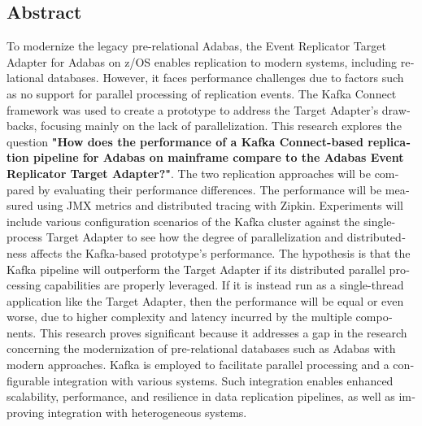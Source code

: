 

\begin{otherlanguage}{american}
	\chapter*{Abstract}
	To modernize the legacy pre-relational Adabas, the Event Replicator Target Adapter for Adabas on z/OS enables replication to modern systems, including relational databases. However, it faces performance challenges due to factors such as no support for parallel processing of replication events. The Kafka Connect framework was used to create a prototype to address the Target Adapter's drawbacks, focusing mainly on the lack of parallelization. This research explores the question \textbf{"How does the performance of a Kafka Connect-based replication pipeline for Adabas on mainframe compare to the Adabas Event Replicator Target Adapter?"}. The two replication approaches will be compared by evaluating their performance differences. The performance will be measured using JMX metrics and distributed tracing with Zipkin. Experiments will include various configuration scenarios of the Kafka cluster against the single-process Target Adapter to see how the degree of parallelization and distributedness affects the Kafka-based prototype's performance.
    The hypothesis is that the Kafka pipeline will outperform the Target Adapter if its distributed parallel processing capabilities are properly leveraged. If it is instead run as a single-thread application like the Target Adapter, then the performance will be equal or even worse, due to higher complexity and latency incurred by the multiple components. This research proves significant because it addresses a gap in the research concerning the modernization of pre-relational databases such as Adabas with modern approaches. Kafka is employed to facilitate parallel processing and a configurable integration with various systems. Such integration enables enhanced scalability, performance, and resilience in data replication pipelines, as well as improving integration with heterogeneous systems.
\end{otherlanguage}

